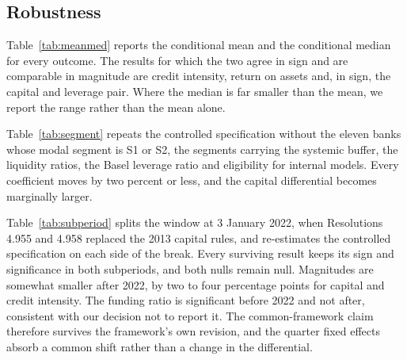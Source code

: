 \documentclass[11pt,a4paper]{article}
\begin{document}
\subsection{Robustness}
\label{sec:robustness}

Table~\ref{tab:meanmed} reports the conditional mean and the conditional median for every
outcome. The results for which the two agree in sign and are comparable in magnitude are
credit intensity, return on assets and, in sign, the capital and leverage pair. Where the
median is far smaller than the mean, we report the range rather than the mean alone.

\begin{table}[htbp]
\centering
\begin{threeparttable}
\caption{Conditional mean and conditional median}
\label{tab:meanmed}

\end{threeparttable}
\end{table}

\begin{table}[htbp]
\centering
\begin{threeparttable}
\caption{Excluding the segments where prudential requirements differ}
\label{tab:segment}

\end{threeparttable}
\end{table}

Table~\ref{tab:segment} repeats the controlled specification without the eleven banks
whose modal segment is S1 or S2, the segments carrying the systemic buffer, the liquidity
ratios, the Basel leverage ratio and eligibility for internal models. Every coefficient
moves by two percent or less, and the capital differential becomes marginally larger.

Table~\ref{tab:subperiod} splits the window at 3 January 2022, when Resolutions 4.955 and
4.958 replaced the 2013 capital rules, and re-estimates the controlled specification on
each side of the break. Every surviving result keeps its sign and significance in both
subperiods, and both nulls remain null. Magnitudes are somewhat smaller after 2022, by
two to four percentage points for capital and credit intensity. The funding ratio is
significant before 2022 and not after, consistent with our decision not to report it. The
common-framework claim therefore survives the framework's own revision, and the quarter
fixed effects absorb a common shift rather than a change in the differential.

\begin{table}[htbp]
\centering
\begin{threeparttable}
\caption{Cooperative differential before and after the 2022 capital rules}
\label{tab:subperiod}

\end{threeparttable}
\end{table}
\end{document}
